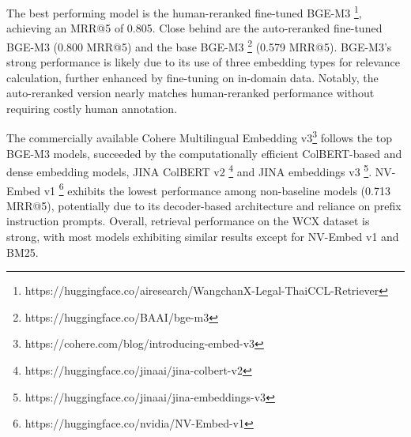 The best performing model is the human-reranked fine-tuned BGE-M3 \footnote{https://huggingface.co/airesearch/WangchanX-Legal-ThaiCCL-Retriever}, achieving an MRR@5 of 0.805. Close behind are the auto-reranked fine-tuned BGE-M3 (0.800 MRR@5) and the base BGE-M3 \footnote{https://huggingface.co/BAAI/bge-m3} (0.579 MRR@5). BGE-M3's strong performance is likely due to its use of three embedding types for relevance calculation, further enhanced by fine-tuning on in-domain data. Notably, the auto-reranked version nearly matches human-reranked performance without requiring costly human annotation.


The commercially available {Cohere Multilingual Embedding v3}\footnote{https://cohere.com/blog/introducing-embed-v3} follows the top BGE-M3 models, succeeded by the computationally efficient ColBERT-based and dense embedding models, JINA ColBERT v2 \footnote{https://huggingface.co/jinaai/jina-colbert-v2} and JINA embeddings v3 \footnote{https://huggingface.co/jinaai/jina-embeddings-v3}. NV-Embed v1 \footnote{https://huggingface.co/nvidia/NV-Embed-v1} exhibits the lowest performance among non-baseline models (0.713 MRR@5), potentially due to its decoder-based architecture and reliance on prefix instruction prompts. Overall, retrieval performance on the WCX dataset is strong, with most models exhibiting similar results except for NV-Embed v1 and BM25.


